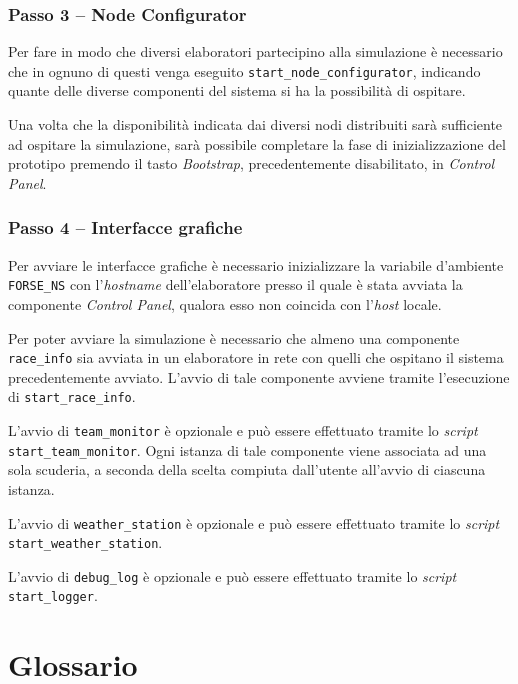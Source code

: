 \documentclass[a4paper]{report}
\begin{document}
\subsection*{Passo 3 -- Node Configurator}
Per fare in modo che diversi elaboratori partecipino alla simulazione è necessario che in ognuno di questi venga eseguito \texttt{start\_node\_configurator}, indicando quante delle diverse componenti del sistema si ha la possibilità di ospitare.

Una volta che la disponibilità indicata dai diversi nodi distribuiti sarà sufficiente ad ospitare la simulazione, sarà possibile completare la fase di inizializzazione del prototipo premendo il tasto \textsl{Bootstrap}, precedentemente disabilitato, in \textsl{Control Panel}.

\subsection*{Passo 4 -- Interfacce grafiche}
Per avviare le interfacce grafiche è necessario inizializzare la variabile d'ambiente \texttt{FORSE\_NS} con l'\textit{hostname} dell'elaboratore presso il quale è stata avviata la componente \textsl{Control Panel}, qualora esso non coincida con l'\textit{host} locale.

Per poter avviare la simulazione è necessario che almeno una componente \texttt{race\_info} sia avviata in un elaboratore in rete con quelli che ospitano il sistema precedentemente avviato. L'avvio di tale componente avviene tramite l'esecuzione di \texttt{start\_race\_info}.

L'avvio di \texttt{team\_monitor} è opzionale e può essere effettuato tramite lo \textit{script} \texttt{start\_team\_monitor}. Ogni istanza di tale componente viene associata ad una sola scuderia, a seconda della scelta compiuta dall'utente all'avvio di ciascuna istanza.

L'avvio di \texttt{weather\_station} è opzionale e può essere effettuato tramite lo \textit{script} \texttt{start\_weather\_station}.

L'avvio di \texttt{debug\_log} è opzionale e può essere effettuato tramite lo \textit{script} \texttt{start\_logger}.

\chapter{Glossario}
\end{document}
